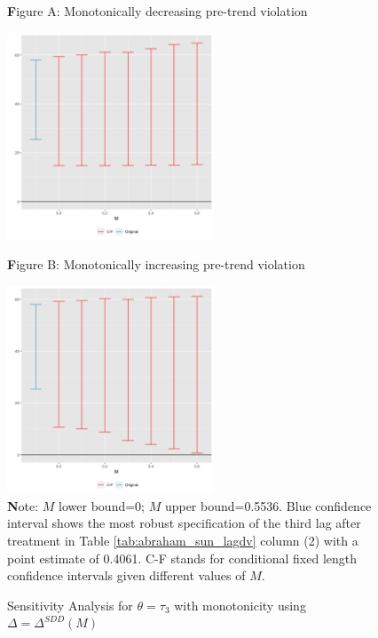 \documentclass[12pt]{amsart}
\numberwithin{equation}{section}
\theoremstyle{definition}
\theoremstyle{definition}
\theoremstyle{definition}
\begin{document}
\begin{appendix}
\clearpage

\begin{figure}[h]  
\centering
\caption{Sensitivity Analysis for $\theta=\tau_3$ with monotonicity using $\Delta = \Delta^{SDD}(M)$} 
\label{fig:pretrend_violations}

\begin{center} 
	{\textbf Figure A: Monotonically decreasing pre-trend violation}
\end{center} 
\includegraphics[width=0.55\textwidth]{Figures/pretrends_sensitivity_decreasing.png}
\begin{center}
	{\textbf Figure B: Monotonically increasing pre-trend violation}
\end{center}
\includegraphics[width=0.55\textwidth]{Figures/pretrends_sensitivity_increasing.png}
       \captionsetup{justification=centering}
       \\  
       
 {\textbf Note: $M$ lower bound=0; $M$ upper bound=0.5536. Blue confidence interval shows the most robust specification of the third lag after treatment in Table \ref{tab:abraham_sun_lagdv} column (2) with a point estimate of 0.4061. C-F stands for conditional fixed length confidence intervals given different values of $M$.} 
\end{figure} 
      

\end{appendix}
\end{document}
